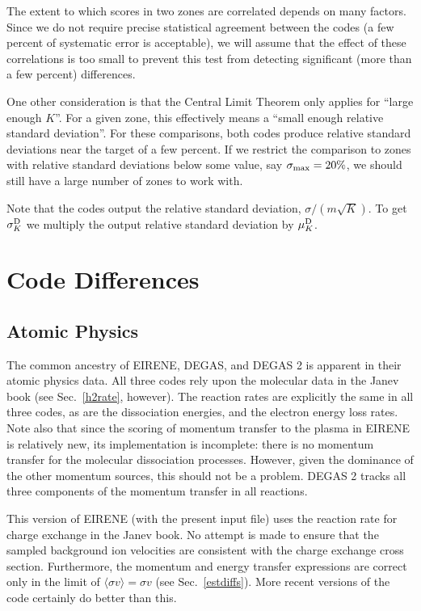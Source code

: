 \documentclass[12pt]{report}
\begin{document}
The extent to which scores in two zones are correlated depends
on many factors. Since we do not require precise statistical agreement
between the codes (a few percent of systematic error is acceptable), we
will assume that the effect of these correlations is too small to prevent this
test from detecting significant (more than a few percent) differences.

One other consideration is that the Central Limit Theorem only
applies for ``large enough $K$''.
For a given zone, this effectively means a ``small enough
relative standard deviation''.
For these comparisons, both codes produce relative standard
deviations near the target of a few percent.
If we restrict the comparison to zones with relative standard
deviations below some value, say $\sigma_{\rm max} = 20 \%$, 
we should still have a large
number of zones to work with.

Note that the codes output the relative standard deviation,
$\sigma / (m \sqrt{K})$.
To get $\sigma^{\rm D}_{K}$ we multiply the 
output relative standard deviation by $\mu^{\rm D}_{K}$.

\section{Code Differences}
\label{codediffs}

\subsection{Atomic Physics}

The common ancestry of EIRENE, DEGAS, and DEGAS 2 is apparent in their
atomic physics data. All three
codes rely upon the molecular data in the Janev book\cite{Jane87} (see 
Sec.~\ref{h2rate}, however). The reaction rates
are explicitly the same in all three codes, as are the dissociation energies,
and the electron energy loss rates. 
Note also that since the 
scoring of momentum transfer to the plasma in EIRENE is relatively new, 
its implementation is incomplete: there is no momentum transfer for the
molecular dissociation processes. However, given the dominance of the other
momentum sources, this should not be a problem. DEGAS 2 tracks all three
components of the momentum transfer in all reactions.

This version of EIRENE (with the present input file) uses the reaction
rate for charge exchange in the Janev book\cite{Jane87}. 
No attempt is made to ensure
that the sampled background ion velocities are consistent with the 
charge exchange cross section\cite{Heif82}.
Furthermore, the momentum and energy transfer expressions are correct only
in the limit of $\langle \sigma v \rangle = \sigma v$ 
(see Sec.~\ref{estdiffs}). More recent
versions of the code certainly do better than this\cite{Reit93}.
\end{document}
